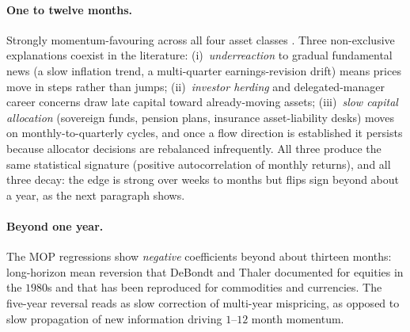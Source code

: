 \paragraph{One to twelve months.} Strongly momentum-favouring
across all four asset classes \citeMOP. Three non-exclusive
explanations coexist in the literature: (i)~\emph{underreaction}
to gradual fundamental news (a slow inflation trend, a
multi-quarter earnings-revision drift) means prices move in
steps rather than jumps; (ii)~\emph{investor herding} and
delegated-manager career concerns draw late capital toward
already-moving assets; (iii)~\emph{slow capital allocation}
(sovereign funds, pension plans, insurance asset-liability desks)
moves on monthly-to-quarterly cycles, and once a flow direction
is established it persists because allocator decisions are
rebalanced infrequently. All three produce the same statistical
signature (positive autocorrelation of monthly returns), and
all three decay: the edge is strong over weeks to months but
flips sign beyond about a year, as the next paragraph shows.

\paragraph{Beyond one year.} The MOP regressions show
\emph{negative} coefficients beyond about thirteen months:
long-horizon mean reversion that DeBondt and Thaler documented for
equities in the $1980$s and that has been reproduced for
commodities and currencies. The five-year reversal reads as slow
correction of multi-year mispricing, as opposed to slow
propagation of new information driving $1$--$12$ month momentum.

